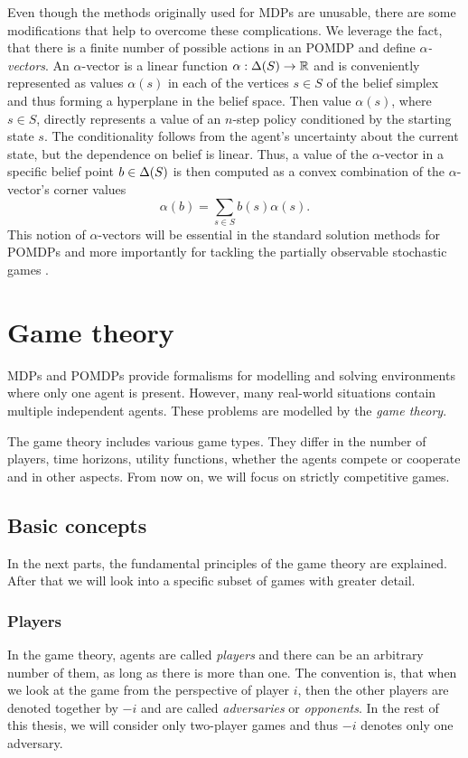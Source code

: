 \documentclass[../main.tex]{subfiles}
\begin{document}
Even though the methods originally used for MDPs are unusable, there are some modifications that help to overcome these complications.
We leverage the fact, that there is a finite number of possible actions in an POMDP and define \textit{$\alpha$-vectors}.
An $\alpha$-vector\cite{avectors} is a linear function $\alpha : \Delta(S) \to \mathbb{R}$ and is conveniently represented as values $\alpha(s)$ in each of the vertices $s \in S$ of the belief simplex and thus forming a hyperplane in the belief space.
Then value $\alpha(s)$, where $s \in S$, directly represents a value of an $n$-step policy conditioned by the starting state $s$.
The conditionality follows from the agent's uncertainty about the current state, but the dependence on belief is linear.
Thus, a value of the $\alpha$-vector in a specific belief point $b \in \Delta(S)$ is then computed as a convex combination of the $\alpha$-vector's corner values
\begin{equation}\label{bg:pomdp:alphavector}
    \alpha(b) = \sum_{s \in S}b(s)\alpha(s).
\end{equation}
This notion of $\alpha$-vectors will be essential in the standard solution methods for POMDPs  and more importantly for tackling the partially observable stochastic games .

\section{Game theory}\label{bg:g}
MDPs and POMDPs provide formalisms for modelling and solving environments where only one agent is present.
However, many real-world situations contain multiple independent agents.
These problems are modelled by the \textit{game theory}.

The game theory includes various game types.
They differ in the number of players, time horizons, utility functions, whether the agents compete or cooperate and in other aspects.
From now on, we will focus on strictly competitive games.

\subsection{Basic concepts}\label{bg:g:basics}
In the next parts, the fundamental principles of the game theory are explained.
After that we will look into a specific subset of games with greater detail.

\subsubsection{Players}\label{bg:g:basics:players}
In the game theory, agents are called \textit{players} and there can be an arbitrary number of them, as long as there is more than one.
The convention is, that when we look at the game from the perspective of player $i$, then the other players are denoted together by $-i$ and are called \textit{adversaries} or \textit{opponents}.
In the rest of this thesis, we will consider only two-player games and thus $-i$ denotes only one adversary.
\end{document}
